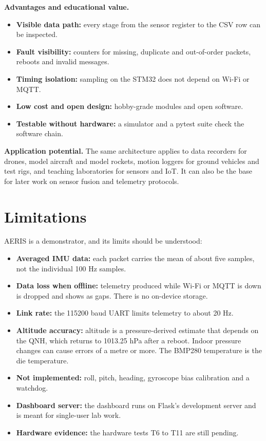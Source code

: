 \documentclass[12pt,a4paper]{report}
\begin{document}
\textbf{Advantages and educational value.}
\begin{itemize}
\item \textbf{Visible data path:} every stage from the sensor register to the CSV row can be inspected.
\item \textbf{Fault visibility:} counters for missing, duplicate and out-of-order packets, reboots and invalid messages.
\item \textbf{Timing isolation:} sampling on the STM32 does not depend on Wi-Fi or MQTT.
\item \textbf{Low cost and open design:} hobby-grade modules and open software.
\item \textbf{Testable without hardware:} a simulator and a pytest suite check the software chain.
\end{itemize}

\textbf{Application potential.} The same architecture applies to data recorders for drones, model aircraft and model rockets, motion loggers for ground vehicles and test rigs, and teaching laboratories for sensors and IoT. It can also be the base for later work on sensor fusion and telemetry protocols.

\section{Limitations}
\label{sec:limitations}
AERIS is a demonstrator, and its limits should be understood:
\begin{itemize}
\item \textbf{Averaged IMU data:} each packet carries the mean of about five samples, not the individual 100 Hz samples.
\item \textbf{Data loss when offline:} telemetry produced while Wi-Fi or MQTT is down is dropped and shows as gaps. There is no on-device storage.
\item \textbf{Link rate:} the 115200 baud UART limits telemetry to about 20 Hz.
\item \textbf{Altitude accuracy:} altitude is a pressure-derived estimate that depends on the QNH, which returns to 1013.25 hPa after a reboot. Indoor pressure changes can cause errors of a metre or more. The BMP280 temperature is the die temperature.
\item \textbf{Not implemented:} roll, pitch, heading, gyroscope bias calibration and a watchdog.
\item \textbf{Dashboard server:} the dashboard runs on Flask's development server and is meant for single-user lab work.
\item \textbf{Hardware evidence:} the hardware tests T6 to T11 are still pending.
\end{itemize}
\end{document}
